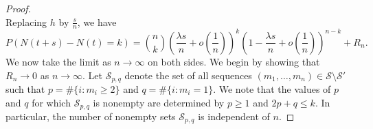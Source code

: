 \documentclass{homework}
\begin{document}
\begin{proof}
\begin{equation*}
		\end{equation*}
		Replacing $h$ by $\frac{s}{n}$, we have
		\begin{equation*}
			P(N(t+s) - N(t) = k) = \binom{n}{k}\left(\frac{\lambda s}{n} + o\left(\frac{1}{n}\right)\right)^k\left(1 - \frac{\lambda s}{n} + o\left(\frac{1}{n}\right)\right)^{n-k} + R_n.
		\end{equation*}
		We now take the limit as $n \to \infty$ on both sides. We begin by showing that $R_n\to 0$ as $n \to \infty$. Let $\mathcal{S}_{p,q}$ denote the set of all sequences $(m_1, \dots, m_n) \in \mathcal{S} \setminus \mathcal{S}'$ such that $p = \#\{i : m_i \ge 2\}$ and $q = \#\{i : m_i = 1\}$. We note that the values of $p$ and $q$ for which $\mathcal{S}_{p,q}$ is nonempty are determined by $p \ge 1$ and $2p + q \le k$. In particular, the number of nonempty sets $\mathcal{S}_{p,q}$ is independent of $n$.
		

\end{proof}
\end{document}

